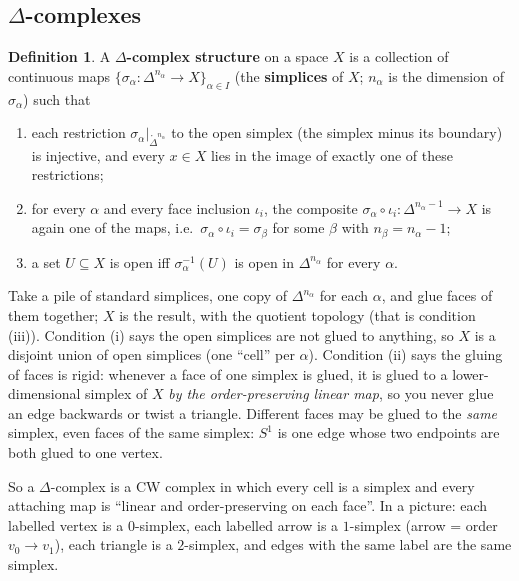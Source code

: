 \documentclass[11pt]{article}
\theoremstyle{definition}
\newtheorem{defn}[thm]{Definition}
\begin{document}
\subsection{$\Delta$-complexes}
\begin{defn}
A \textbf{$\Delta$-complex structure} on a space $X$ is a collection of continuous maps $\{\sigma_\alpha:\Delta^{n_\alpha}\to X\}_{\alpha\in I}$ (the \textbf{simplices} of $X$; $n_\alpha$ is the dimension of $\sigma_\alpha$) such that
\begin{enumerate}[label=(\roman*)]
\item each restriction $\sigma_\alpha|_{\mathring\Delta^{n_\alpha}}$ to the open simplex (the simplex minus its boundary) is injective, and every $x\in X$ lies in the image of exactly one of these restrictions;
\item for every $\alpha$ and every face inclusion $\iota_i$, the composite $\sigma_\alpha\circ\iota_i:\Delta^{n_\alpha-1}\to X$ is again one of the maps, i.e.\ $\sigma_\alpha\circ\iota_i=\sigma_\beta$ for some $\beta$ with $n_\beta=n_\alpha-1$;
\item a set $U\subseteq X$ is open iff $\sigma_\alpha^{-1}(U)$ is open in $\Delta^{n_\alpha}$ for every $\alpha$.
\end{enumerate}
\end{defn}
\begin{intuition}
Take a pile of standard simplices, one copy of $\Delta^{n_\alpha}$ for each $\alpha$, and glue faces of them together; $X$ is the result, with the quotient topology (that is condition (iii)). Condition (i) says the open simplices are not glued to anything, so $X$ is a disjoint union of open simplices (one ``cell'' per $\alpha$). Condition (ii) says the gluing of faces is rigid: whenever a face of one simplex is glued, it is glued to a lower-dimensional simplex of $X$ \emph{by the order-preserving linear map}, so you never glue an edge backwards or twist a triangle. Different faces may be glued to the \emph{same} simplex, even faces of the same simplex: $S^1$ is one edge whose two endpoints are both glued to one vertex.

So a $\Delta$-complex is a CW complex in which every cell is a simplex and every attaching map is ``linear and order-preserving on each face''. In a picture: each labelled vertex is a $0$-simplex, each labelled arrow is a $1$-simplex (arrow = order $v_0\to v_1$), each triangle is a $2$-simplex, and edges with the same label are the same simplex.
\end{intuition}
\end{document}
